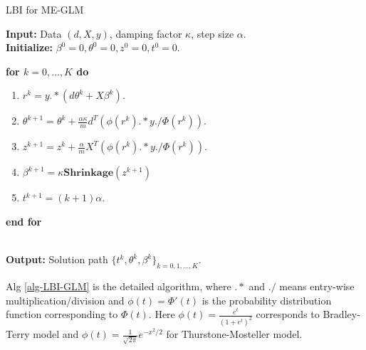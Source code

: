 \documentclass[10pt,journal,cspaper,compsoc]{IEEEtran}
\begin{document}
{\begin{algorithm}
\caption{LBI for ME-GLM}\label{alg-LBI-GLM}
\textbf{Input:} Data $(d,X,y)$, damping factor $\kappa$, step size $\alpha$.\\
\textbf{Initialize:} $\beta^0 = 0,\theta^0 = 0,z^0=0,t^0=0$.\\
{\textbf{for $k=0,\dots,K$ do}
\begin{enumerate}
\item $r^k = y.*(d\theta^k + X\beta^k)$.
\item $\theta^{k+1} = \theta^k +  \frac{\alpha\kappa}{m}   d^T(\phi(r^k).*y./\Phi(r^k))$.
\item $z^{k+1}  =z^{k} + \frac{\alpha}{m} X^T(\phi(r^k).*y./\Phi(r^k))$.
\item $\beta^{k+1} = \kappa\mathbf{Shrinkage}(z^{k+1})$
\item $t^{k+1} = (k+1)\alpha$.
\end{enumerate}
\textbf{end for}}\\
\textbf{Output:} Solution path $\{t^k, \theta^k,\beta^k\}_{k= 0,1,\dots,K}$.
\end{algorithm}
Alg \ref{alg-LBI-GLM} is the detailed algorithm, where $.*$ and $./$ means entry-wise multiplication/division and $\phi(t) = \Phi'(t)$ is the probability distribution function corresponding to $\Phi(t)$. Here $\phi(t) =  \frac{e^t}{(1+e^{t})^2}$ corresponds to Bradley-Terry model and $\phi(t) = \frac{1}{\sqrt{2\pi}}e^{-x^2/2}$ for Thurstone-Mosteller model.


}
\end{document}
